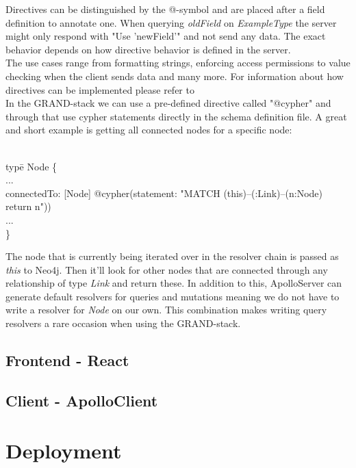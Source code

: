 Directives can be distinguished by the @-symbol and are placed after a field definition to annotate one. When querying \emph{oldField} on \emph{ExampleType} the server might only respond with "Use 'newField'" and not send any data. The exact behavior depends on how directive behavior is defined in the server. \\
The use cases range from formatting strings, enforcing access permissions to value checking when the client sends data and many more. For information about how directives can be implemented please refer to
\\
In the GRAND-stack we can use a pre-defined directive called "@cypher" and through that use cypher statements directly in the schema definition file. A great and short example is getting all connected nodes for a specific node:
\begin{exmp}
\label{ex246}
\begin{tabbing}
\\
typ\=e Node \{ \\
\> ... \\
\> connectedTo: [Node] @cypher(statement: "MATCH (this)--(:Link)--(n:Node) return n")) \\
\> ...\\
\}
\end{tabbing}
\end{exmp}
The node that is currently being iterated over in the resolver chain is passed as \emph{this} to Neo4j. Then it'll look for other nodes that are connected through any relationship of type \emph{Link} and return these. In addition to this, ApolloServer can generate default resolvers for queries and mutations meaning we do not have to write a resolver for \emph{Node} on our own. This combination makes writing query resolvers a rare occasion when using the GRAND-stack.

\section{Frontend - React}

\section{Client - ApolloClient}

\chapter{Deployment}
